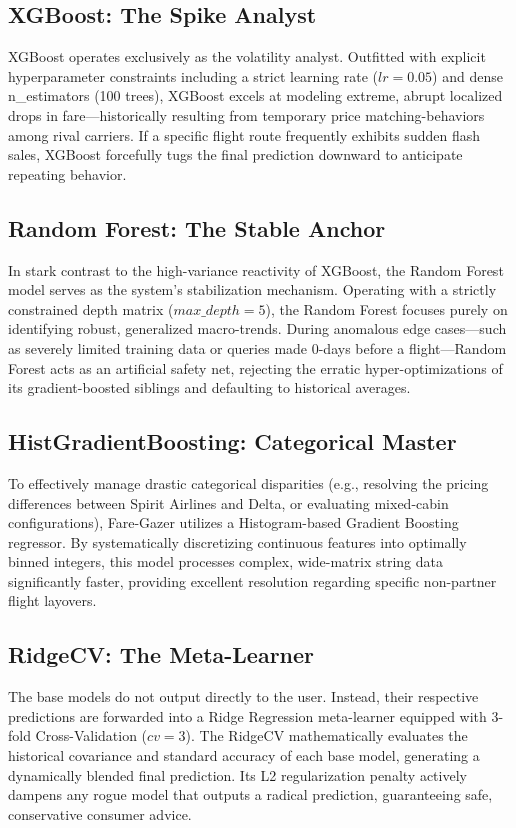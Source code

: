 \documentclass[12pt, a4paper]{article}
\begin{document}
\subsection{XGBoost: The Spike Analyst}
XGBoost operates exclusively as the volatility analyst. Outfitted with explicit hyperparameter constraints including a strict learning rate ($lr=0.05$) and dense n\_estimators (100 trees), XGBoost excels at modeling extreme, abrupt localized drops in fare—historically resulting from temporary price matching-behaviors among rival carriers. If a specific flight route frequently exhibits sudden flash sales, XGBoost forcefully tugs the final prediction downward to anticipate repeating behavior.

\subsection{Random Forest: The Stable Anchor}
In stark contrast to the high-variance reactivity of XGBoost, the Random Forest model serves as the system's stabilization mechanism. Operating with a strictly constrained depth matrix ($max\_depth=5$), the Random Forest focuses purely on identifying robust, generalized macro-trends. During anomalous edge cases—such as severely limited training data or queries made 0-days before a flight—Random Forest acts as an artificial safety net, rejecting the erratic hyper-optimizations of its gradient-boosted siblings and defaulting to historical averages.

\subsection{HistGradientBoosting: Categorical Master}
To effectively manage drastic categorical disparities (e.g., resolving the pricing differences between Spirit Airlines and Delta, or evaluating mixed-cabin configurations), Fare-Gazer utilizes a Histogram-based Gradient Boosting regressor. By systematically discretizing continuous features into optimally binned integers, this model processes complex, wide-matrix string data significantly faster, providing excellent resolution regarding specific non-partner flight layovers.

\subsection{RidgeCV: The Meta-Learner}
The base models do not output directly to the user. Instead, their respective predictions are forwarded into a Ridge Regression meta-learner equipped with 3-fold Cross-Validation ($cv=3$). The RidgeCV mathematically evaluates the historical covariance and standard accuracy of each base model, generating a dynamically blended final prediction. Its L2 regularization penalty actively dampens any rogue model that outputs a radical prediction, guaranteeing safe, conservative consumer advice.
\end{document}
